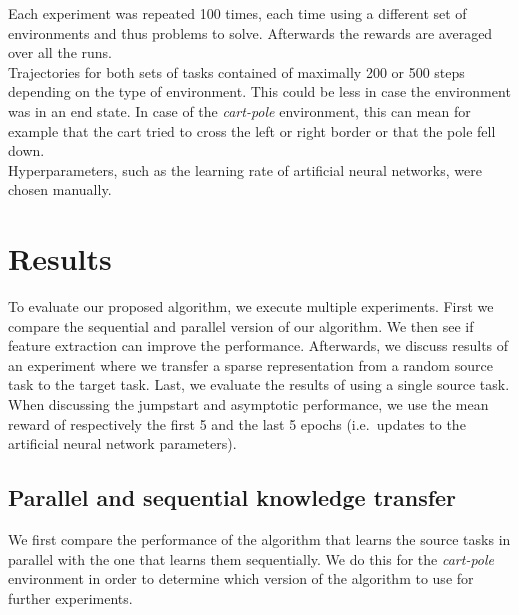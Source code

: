 Each experiment was repeated 100 times, each time using a different set of environments and thus problems to solve.
Afterwards the rewards are averaged over all the runs.\\
Trajectories for both sets of tasks contained of maximally 200 or 500 steps depending on the type of environment.
This could be less in case the environment was in an end state.
In case of the \emph{cart-pole} environment, this can mean for example that the cart tried to cross the left or right border or that the pole fell down.\\
Hyperparameters, such as the learning rate of artificial neural networks, were chosen manually.

\section{Results}
To evaluate our proposed algorithm, we execute multiple experiments. First we compare the sequential and parallel version of our algorithm. We then see if feature extraction can improve the performance. Afterwards, we discuss results of an experiment where we transfer a sparse representation from a random source task to the target task. Last, we evaluate the results of using a single source task.\\
When discussing the jumpstart and asymptotic performance, we use the mean reward of respectively the first 5 and the last 5 epochs (i.e.\ updates to the artificial neural network parameters).

\subsection{Parallel and sequential knowledge transfer} %
\label{sub:parallel_and_sequential_knowledge_transfer}
We first compare the performance of the algorithm that learns the source tasks in parallel with the one that learns them sequentially. We do this for the \emph{cart-pole} environment in order to determine which version of the algorithm to use for further experiments.

